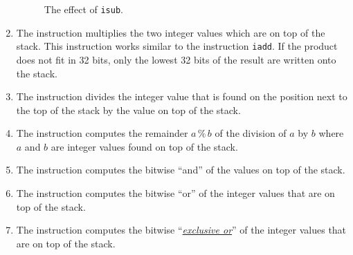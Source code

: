 \begin{enumerate}
\setlength{\unitlength}{0.5cm}
\begin{figure}[!ht]
  \centering
{}
  \caption{The effect of \texttt{isub}.}
  \label{fig:ijvm-sub}
\end{figure}

\item The instruction 
      multiplies the two integer values which are on top of the stack.  This instruction works similar to
      the instruction \texttt{iadd}.  If the product does not fit in 32 bits, only the lowest 32 bits of
      the result are written onto the stack. 
\item The instruction 
      divides the integer value that is found on the position next to the  top of the stack by the value
      on top of the stack. 
\item The instruction 
      computes the remainder $a \,\texttt{\%}\, b$ of the division of $a$ by $b$ where $a$ and $b$ are
      integer values found on top of the stack.
\item The instruction 
      computes the bitwise ``and'' of the values on top of the stack.
\item The instruction 
      computes the bitwise ``or'' of the integer values that are on top of the stack.
\item The instruction 
      computes the bitwise ``\href{http://en.wikipedia.org/wiki/Exclusive_or}{\emph{exclusive or}}'' of
      the integer values that are on top of the stack. 
\end{enumerate}


